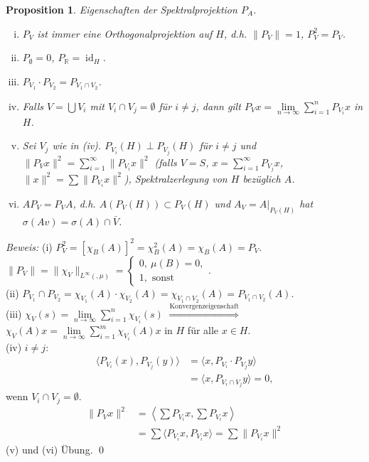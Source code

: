 \documentclass[12pt]{extreport} %
\newtheorem{Prop}[Satz]{Proposition}
\DeclareMathOperator{\id}{id}
\numberwithin{equation}{section}
\newcommand{\R}{\mathbb{R}} %
\newcommand{\m}{\cdot}
\newcommand{\Bew}{\emph{Beweis: }}
\begin{document}
	
	\begin{Prop}
		Eigenschaften der Spektralprojektion $P_A$.
		\begin{enumerate}[(i)]
			\item $P_V$ ist immer eine Orthogonalprojektion auf $H$, d.h. $\|P_V\| = 1$, $P_V^2 = P_V$.
			\item $P_{\emptyset} = 0$, $P_\R = \id_H$.
			\item $P_{V_1}\m P_{V_2} = P_{V_1\cap V_2}$.
			\item Falls $V = \bigcup V_i$ mit $V_i\cap V_j = \emptyset$ für $i\neq j$, dann gilt $P_Vx = \lim\limits_{n\rightarrow\infty} \sum_{i = 1}^{n} P_{V_i}x$ in $H$.
			\item Sei $V_j$ wie in (iv). $P_{V_i}(H)\perp P_{V_j}(H)$ für $i\neq j$ und  $\|P_{V}x\|^2 = \sum_{i=1}^\infty\|P_{V_i}x\|^2$ (falls $V = S$, $x=\sum_{i = 1}^{\infty}P_{V_j}x$, $\|x\|^2 = \sum \|P_{V_i}x\|^2$), Spektralzerlegung von $H$ bezüglich $A$.
			\item $AP_V = P_VA$, d.h. $A(P_V(H))\subset P_V(H)$ und $A_V = A|_{P_V(H)}$ hat $\sigma(Av) = \sigma(A)\cap \bar V$.
		\end{enumerate}
	\end{Prop}
	
	\Bew (i) $P_V^2 = [\chi_B(A)]^2 = \chi_B^2(A) = \chi_B(A) = P_V$. $\|P_V\| = \|\chi_V\|_{L^\infty (,\mu)} = \left\{\begin{array}{l}
	0,~ \mu(B) = 0,\\
	1,\text{ sonst}
	\end{array} \right.$.\\
	(ii) $P_{V_1} \cap P_{V_2} = \chi_{V_1}(A) \m \chi_{V_2}(A) = \chi_{V_1\cap V_2}(A) = P_{V_1\cap V_2}(A)$.\\
	(iii) $\chi_V(s) = \lim\limits_{n\rightarrow \infty} \sum_{i = 1}^{n}\chi_{V_i}(s)$ $\overset{\text{Konvergenzeigenschaft}}{\Longrightarrow}$ $\chi_V(A) x = \lim\limits_{n\rightarrow\infty} \sum_{i = 1}^{m} \chi_{V_i}(A)x$ in $H$ für alle $x\in H$.\\
	(iv) $i\neq j$: 
	\begin{align*}
		\langle P_{V_i}(x),P_{V_j}(y)\rangle &= \langle x,P_{V_i}\m P_{V_j}y\rangle \\
		&= \langle x, P_{V_i\cap V_j}y\rangle = 0,
	\end{align*}
	wenn $V_i\cap V_j = \emptyset$.
	\begin{align*}
		\|P_V x\|^2 &= \left\langle\sum P_{V_i}x,\sum P_{V_i}x\right\rangle \\
		&= \sum\langle P_{V_i}x,P_{V_i}x\rangle = \sum \| P_{V_i}x\|^2
	\end{align*}
	(v) und (vi) Übung.
	\qed
	
\end{document}
